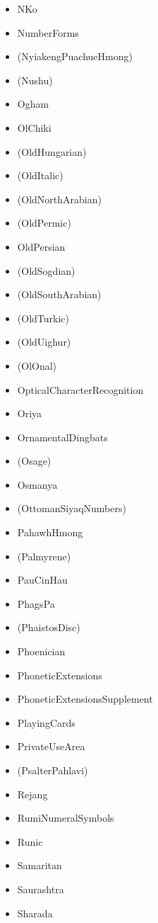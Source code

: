 \documentclass{article}
\newenvironment{itemlist}{%
  \begin{itemize}
  \setlength{\itemsep}{0pt}
  \setlength{\parsep}{0pt}
  \setlength{\topsep}{0pt}
  \setlength{\partopsep}{0pt}
  \setlength{\parskip}{0pt}
  \setlength{\labelsep}{5pt}}%
{
  \end{itemize}}
\begin{document}
\begin{multicols*}{2}
\begin{itemlist}
        \item NKo
        \item NumberForms
        \item (NyiakengPuachueHmong)
        \item (Nushu)
        \item Ogham
        \item OlChiki
        \item (OldHungarian)
        \item (OldItalic)
        \item (OldNorthArabian)
        \item (OldPermic)
        \item OldPersian
        \item (OldSogdian)
        \item (OldSouthArabian)
        \item (OldTurkic)
        \item (OldUighur)
        \item (OlOnal)
        \item OpticalCharacterRecognition
        \item Oriya
        \item OrnamentalDingbats
        \item (Osage)
        \item Osmanya
        \item (OttomanSiyaqNumbers)
        \item PahawhHmong
        \item (Palmyrene)
        \item PauCinHau
        \item PhagsPa
        \item (PhaistosDisc)
        \item Phoenician
        \item PhoneticExtensions
        \item PhoneticExtensionsSupplement
        \item PlayingCards
        \item PrivateUseArea
        \item (PsalterPahlavi)
        \item Rejang
        \item RumiNumeralSymbols
        \item Runic
        \item Samaritan
        \item Saurashtra
        \item Sharada

\end{itemlist}
\end{multicols*}
\end{document}
